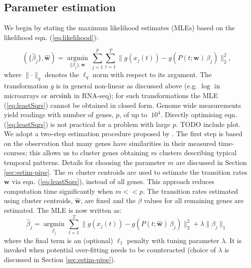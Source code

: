 \subsection{Parameter estimation}
\label{sec:parameter-estimation}

We begin by stating the maximum likelihood estimates (MLEs) based on the likelihood eqn. (\ref{eq:likelihood}):

\begin{equation}
  \label{eq:leastSqrs}
  (\lbrace\hat{\beta}_j\rbrace, \hat{\mathbf{w}}) =  \underset{\lbrace\beta_j\rbrace, \mathbf{w}}{\operatorname{argmin}} \, \sum_{j=1}^p \sum_{t=1}^T \lVert g(x_j(t)) - g\left(P(t; \mathbf{w})\,\beta_j \right) \rVert_2^2,%
\end{equation}
where $\lVert \cdot \rVert_q$ denotes the $\ell_q$ norm with respect to its argument.
The transformation $g$ is in general non-linear as discussed above (e.g. $\log$ in microarrays or $\operatorname{arcsinh}$ in RNA-seq); for such transformations the MLE (\ref{eq:leastSqrs}) cannot be obtained in closed form. Genome wide measurements yield readings with number of genes, $p$, of up to $~10^4$. Directly optimising eqn. (\ref{eq:leastSqrs}) is not practical for a problem with large $p$. {\color{red} TODO include  plot}. We adopt a two-step estimation procedure proposed by \cite{Armond:2013}. The first step is based on the observation that many genes have similarities in their measured time-courses; this allows us to cluster genes obtaining $m$ clusters describing typical temporal patterns. Details for choosing the parameter $m$ are discussed in Section \ref{sec:estim-pipe}. The $m$ cluster centroids are used to estimate the transition rates $\mathbf{w}$ via eqn. (\ref{eq:leastSqrs}), instead of all genes. This approach reduces computation time significantly when $m << p$. 
The transition rates estimated using cluster centroids, $\hat{\mathbf{w}}$, are fixed and the $\beta$ values for all remaining genes are estimated. The MLE is now written as:
\begin{equation}
  \label{eq:leastSqrs.indep}
\hat{\beta}_j  =  \underset{\beta_j}{\operatorname{argmin}} \, \sum_{t=1}^T \lVert g(x_j(t)) - g\left(P(t; \hat{\mathbf{w}})\,\beta_j \right) \rVert_2^2 + \lambda \lVert \beta_j \rVert_1
\end{equation}
where the final term is an (optional) $\ell_1$ penalty with tuning parameter $\lambda$. It is invoked when potential over-fitting needs to be counteracted (choice of $\lambda$ is discussed in Section \ref{sec:estim-pipe}). 

